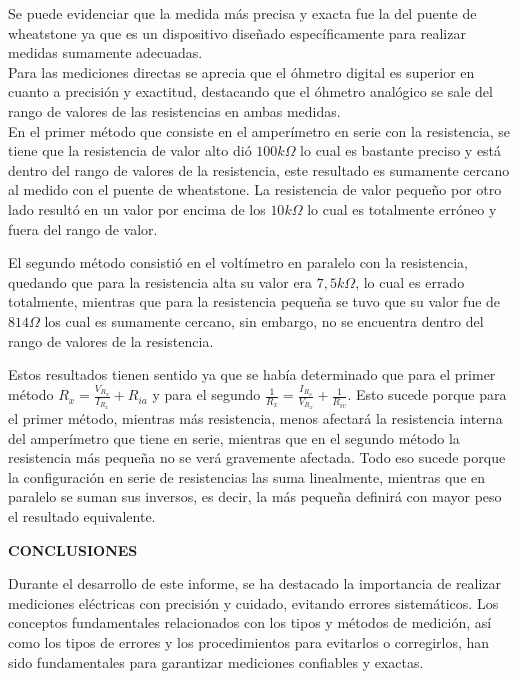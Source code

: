 \documentclass[12pt]{article}
\begin{document}
	\noindent Se puede evidenciar que la medida más precisa y exacta fue la del puente de wheatstone ya que es un dispositivo diseñado específicamente para realizar medidas sumamente adecuadas.\\
	
	\noindent Para las mediciones directas se aprecia que el óhmetro digital es superior en cuanto a precisión y exactitud, destacando que el óhmetro analógico se sale del rango de valores de las resistencias en ambas medidas.\\
	
	\noindent En el primer método que consiste en el amperímetro en serie con la resistencia, se tiene que la resistencia de valor alto dió $100k\Omega$ lo cual es bastante preciso y está dentro del rango de valores de la resistencia, este resultado es sumamente cercano al medido con el puente de wheatstone. La resistencia de valor pequeño por otro lado resultó en un valor por encima de los $10k\Omega$ lo cual es totalmente erróneo y fuera del rango de valor.
	
	\noindent El segundo método consistió en el voltímetro en paralelo con la resistencia, quedando que para la resistencia alta su valor era $7,5k\Omega$, lo cual es errado totalmente, mientras que para la resistencia pequeña se tuvo que su valor fue de $814\Omega$ los cual es sumamente cercano, sin embargo, no se encuentra dentro del rango de valores de la resistencia.
	
	\noindent Estos resultados tienen sentido ya que se había determinado que para el primer método $R_x = \frac{V_{R_x}}{I_{R_x}} + R_{ia}$ y para el segundo $\frac{1}{R_x} = \frac{I_{R_x}}{V_{R_x}} + \frac{1}{R_{iv}}$. Esto sucede porque para el primer método, mientras más resistencia, menos afectará la resistencia interna del amperímetro que tiene en serie, mientras que en el segundo método la resistencia más pequeña no se verá gravemente afectada. Todo eso sucede porque la configuración en serie de resistencias las suma linealmente, mientras que en paralelo se suman sus inversos, es decir, la más pequeña definirá con mayor peso el resultado equivalente.\\
	
	\newpage
	
	\begin{center}
		\textbf{\large CONCLUSIONES}\\
	\end{center}
	
	Durante el desarrollo de este informe, se ha destacado la importancia de realizar mediciones eléctricas con precisión y cuidado, evitando errores sistemáticos. Los conceptos fundamentales relacionados con los tipos y métodos de medición, así como los tipos de errores y los procedimientos para evitarlos o corregirlos, han sido fundamentales para garantizar mediciones confiables y exactas.\\
\end{document}
